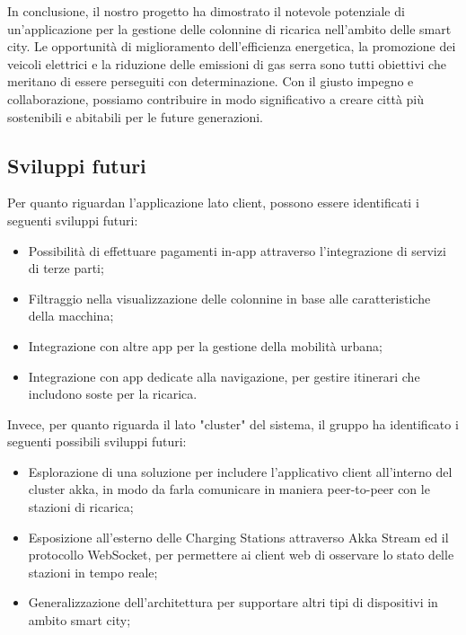 In conclusione, il nostro progetto ha dimostrato il notevole potenziale di un'applicazione per
la gestione delle colonnine di ricarica nell'ambito delle smart city. Le opportunità di
miglioramento dell'efficienza energetica, la promozione dei veicoli elettrici e la riduzione
delle emissioni di gas serra sono tutti obiettivi che meritano di essere perseguiti con
determinazione. Con il giusto impegno e collaborazione, possiamo contribuire in modo
significativo a creare città più sostenibili e abitabili per le future generazioni.

\subsection{Sviluppi futuri}

Per quanto riguardan l'applicazione lato client, possono essere identificati i seguenti sviluppi futuri:

\begin{itemize}
    \item Possibilità di effettuare pagamenti in-app attraverso l'integrazione di servizi di terze parti;
    \item Filtraggio nella visualizzazione delle colonnine in base alle caratteristiche della macchina;
    \item Integrazione con altre app per la gestione della mobilità urbana;
    \item Integrazione con app dedicate alla navigazione, per gestire itinerari che includono soste per la ricarica.
\end{itemize}

Invece, per quanto riguarda il lato "cluster" del sistema, il gruppo ha identificato i seguenti possibili sviluppi futuri:

\begin{itemize}
    \item Esplorazione di una soluzione per includere l'applicativo client all'interno del cluster akka, in modo da farla comunicare in maniera peer-to-peer con le stazioni di ricarica;
    \item Esposizione all'esterno delle Charging Stations attraverso Akka Stream ed il protocollo WebSocket, per permettere ai client web di osservare lo stato delle stazioni in tempo reale;
    \item Generalizzazione dell'architettura per supportare altri tipi di dispositivi in ambito smart city;
\end{itemize}

\newpage